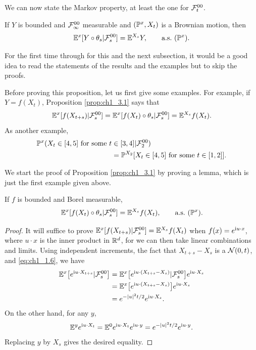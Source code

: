 We can now state the Markov property, at least the one for $\FC_t^{00}$.

\begin{proposition}\label{prop:ch1_3.1}
If $Y$ is bounded and $\FC_\infty^{00}$ measurable and $(\P^x, X_t)$ is a Brownian motion, then
\[
    \E^x[Y \circ \theta_s\mid \FC_s^{00}] = \E^{X_s}Y, \qquad \textnormal{a.s.}~(\P^x).
\]
\end{proposition}

For the first time through for this and the next subsection, it would be a good idea to read the statements of the results and the examples but to skip the proofs.

Before proving this proposition, let us first give some examples. For example, if $Y = f(X_t)$, Proposition \ref{prop:ch1_3.1} says that
\[
    \E^x[f(X_{t+s})\mid \FC_s^{00}] = \E^x[f(X_t) \circ \theta_s\mid \FC_s^{00}] = \E^{X_s}f(X_t).
\]
As another example,
\begin{align*}
    \P^x(X_t \in [4,5]~\text{for some}~t &\in [3,4] \mid \FC_2^{00}) \\
    &= \P^{X_2}[X_t \in [4,5]~\text{for some}~t \in [1,2]].
\end{align*}

We start the proof of Proposition \ref{prop:ch1_3.1} by proving a lemma, which is just the first example given above.

\begin{lemma}\label{lem:ch1_3.2}
If $f$ is bounded and Borel measurable,
\[
    \E^x[f(X_t) \circ \theta_s\mid \FC_s^{00}] = \E^{X_s}f(X_t), \qquad \textnormal{a.s.}~(\P^x).
\]
\end{lemma}

\begin{proof}
It will suffice to prove $\E^x[f(X_{t+s})\mid \FC_s^{00}] = \E^{X_s}f(X_t)$ when $f(x) = e^{\im u\cdot x}$, where $u\cdot x$ is the inner product in $\R^d$, for we can then take linear combinations and limits. Using independent increments, the fact that $X_{t+s} - X_s$ is a $\NC(0,t)$, and \eqref{eq:ch1_1.6}, we have
\begin{align*}
    \E^x\big[e^{\im u\cdot X_{t+s}}\mid \FC_s^{00}\big] &= \E^x\big[e^{\im u\cdot(X_{t+s}-X_s)}\mid \FC_s^{00}\big]e^{\im u\cdot X_s} \\
    &= \E^x\big[e^{\im u\cdot(X_{t+s}-X_s)}\big]e^{\im u\cdot X_s} \\
    &= e^{-|u|^2t/2}e^{\im u\cdot X_s}.
\end{align*}
On the other hand, for any $y$,
\mpagebreak
\begin{align*}
    \E^y e^{\im u\cdot X_t} = \E^0 e^{\im u\cdot X_t}e^{\im u\cdot y} = e^{-|u|^2t/2}e^{\im u\cdot y}.
\end{align*}
Replacing $y$ by $X_s$ gives the desired equality.
\end{proof}

